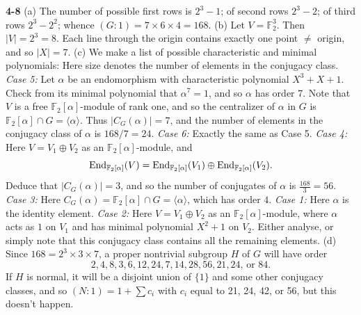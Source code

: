 \documentclass[a4paper,11pt,final]{memoir}%
\theoremstyle{nonumberplain}
\begin{document}
\bigskip\noindent\textbf{4-8}
(a) The number of possible first rows is $2^{3}-1$; of second rows $2^{3}-2$;
of third rows $2^{3}-2^{2}$; whence $(G:1)=7\times6\times4=168$. \noindent(b)
Let $V=\mathbb{F}_{2}^{3}$. Then $|V|=2^{3}=8$. Each line through the origin
contains exactly one point $\neq$ origin, and so $|X|=7$. \noindent(c) We make
a list of possible characteristic and minimal polynomials:
\resizebox{3.3in}{!}{
\begin{minipage}{5in}
\[%
\begin{array}
[c]{lllll}
& \text{Characteristic poly.} & \text{Min'l poly.} & \text{Size} & \text{Order
of element in class}\\
1 & X^{3}+X^{2}+X+1 & X+1 & 1 & 1\\
2 & X^{3}+X^{2}+X+1 & (X+1)^{2} & 21 & 2\\
3 & X^{3}+X^{2}+X+1 & (X+1)^{3} & 42 & 4\\
4 & X^{3}+1=(X+1)(X^{2}+X+1) & \text{Same} & 56 & 3\\
5 & X^{3}+X+1\text{ (irreducible)} & \text{Same} & 24 & 7\\
6 & X^{3}+X^{2}+1\text{ (irreducible)} & \text{Same} & 24 & 7
\end{array}
\]
\end{minipage}
}
Here size denotes the number of elements in the conjugacy class.
\noindent\textit{Case 5:\/} Let $\alpha$ be an endomorphism with
characteristic polynomial $X^{3}+X+1$. Check from its minimal polynomial that
$\alpha^{7}=1$, and so $\alpha$ has order $7$. Note that $V$ is a free
$\mathbb{F}_{2}[\alpha]$-module of rank one, and so the centralizer of
$\alpha$ in $G$ is $\mathbb{F}_{2}[\alpha]\cap G=\langle\alpha\rangle$. Thus
$|C_{G}(\alpha)|=7$, and the number of elements in the conjugacy class of
$\alpha$ is $168/7=24$. \noindent\textit{Case 6:\/} Exactly the same as Case
5. \noindent\textit{Case 4:\/} Here $V=V_{1}\oplus V_{2}$ as an $\mathbb{F}%
_{2}[\alpha]$-module, and
\[
\End_{\mathbb{F}_{2}[\alpha]}(V)=\End_{\mathbb{F}_{2}[\alpha]}(V_{1}%
)\oplus\End_{\mathbb{F}_{2}[\alpha]}(V_{2}).
\]
Deduce that $|C_{G}(\alpha)|=3$, and so the number of conjugates of $\alpha$
is $\frac{168}{3}=56$. \noindent\textit{Case 3:\/} Here $C_{G}(\alpha
)=\mathbb{F}_{2}[\alpha]\cap G=\langle\alpha\rangle$, which has order $4$.
\noindent\textit{Case 1:\/} Here $\alpha$ is the identity element.
\noindent\textit{Case 2:\/} Here $V=V_{1}\oplus V_{2}$ as an $\mathbb{F}%
_{2}[\alpha]$-module, where $\alpha$ acts as $1$ on $V_{1}$ and has minimal
polynomial $X^{2}+1$ on $V_{2}$. Either analyse, or simply note that this
conjugacy class contains all the remaining elements. \noindent(d) Since
$168=2^{3}\times3\times7$, a proper nontrivial subgroup $H$ of $G$ will have
order
\[
2,4,8,3,6,12,24,7,14,28,56,21,24\text{, or }84.
\]
If $H$ is normal, it will be a disjoint union of $\{1\}$ and some other
conjugacy classes, and so $(N:1)=1+\sum c_{i}$ with $c_{i}$ equal to 21, 24,
42, or 56, but this doesn't happen.
\end{document}
